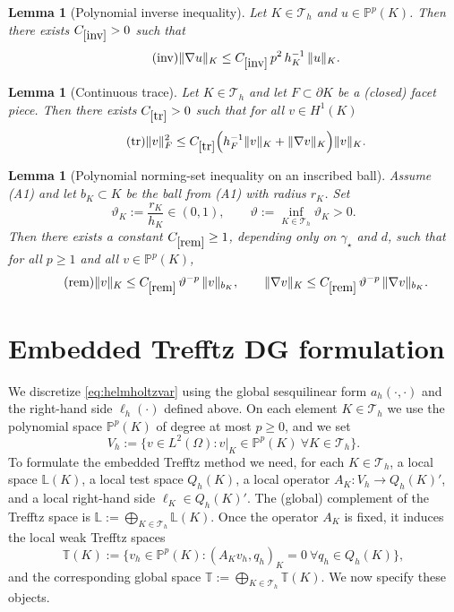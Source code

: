 \documentclass[11pt]{article}
\theoremstyle{definition}
\theoremstyle{plain}
\newtheorem{lemma}[theorem]{Lemma}
\newcommand{\const}[1]{C_{\eqref{#1}}}
\newcommand{\Th}{{\calT_h}}
\newcommand{\AK}{{A_K}}
\newcommand{\ILh}{\mathbb{L}}
\newcommand{\LKh}{\mathbb{L}(K)}
\newcommand{\QKh}{Q_h(K)}
\newcommand{\inner}[1]{( #1 )}
\newcommand{\IP}{\mathbb{P}}
\newcommand{\ITh}{\mathbb{T}}
\newcommand{\calT}{\mathcal{T}}
\begin{document}
\begin{lemma}[Polynomial inverse inequality]\label{lem:inv}
Let $K\in\Th$ and $u\in\IP^p(K)$. Then there exists $\const{inv}>0$ such that
\begin{equation}\tag{inv}\label{inv}
  \|\nabla u\|_{K} \leq \const{inv}\,p^2\,h_K^{-1}\,\|u\|_{K}.
\end{equation}
\end{lemma}

\begin{lemma}[Continuous trace]\label{lem:tr}
Let $K\in\Th$ and let $F\subset\partial K$ be a (closed) facet piece. Then there exists $\const{tr}>0$ such that
for all $v\in H^1(K)$
\begin{equation}\tag{tr}\label{tr}
  \|v\|_{F}^2 \leq \const{tr}
  \Big( h_F^{-1}\|v\|_{K} + \|\nabla v\|_{K}\Big)\|v\|_{K}.
\end{equation}
\end{lemma}

\begin{lemma}[Polynomial norming-set inequality on an inscribed ball]\label{lem:norming}
Assume \textup{(A1)} and let $b_K\subset K$ be the ball from \textup{(A1)} with radius $r_K$.
Set
\[
\vartheta_K := \frac{r_K}{h_K}\in(0,1),
\qquad \vartheta := \inf_{K\in\Th}\vartheta_K>0.
\]
Then there exists a constant $\const{rem}\ge 1$, depending only on $\gamma_\star$ and $d$, such that
for all $p\ge 1$ and all $v\in \IP^p(K)$,
\begin{equation}\tag{rem}\label{rem}
\|v\|_{K} \le \const{rem}\,\vartheta^{-p}\,\|v\|_{b_K},
\qquad
\|\nabla v\|_{K} \le \const{rem}\,\vartheta^{-p}\,\|\nabla v\|_{b_K}.
\end{equation}
\end{lemma}





\section{Embedded Trefftz DG formulation}\label{sec:etdg}
We discretize \eqref{eq:helmholtzvar} using the global sesquilinear form $a_h(\cdot,\cdot)$ and the right-hand side $\ell_h(\cdot)$ defined above. On each element $K\in\Th$ we use the polynomial space $\IP^p(K)$ of degree at most $p\ge 0$, and we set
\[
V_h := \{v\in L^2(\Omega): v|_K\in \IP^p(K)\ \forall K\in\Th\}.
\]
To formulate the embedded Trefftz method we need, for each $K\in\Th$, a local space $\LKh$, a local test space $\QKh$, a local operator $\AK:V_h\to\QKh'$, and a local right-hand side $\ell_K\in\QKh'$. The (global) complement of the Trefftz space is
$
\ILh := \bigoplus_{K\in\Th}\LKh .
$
Once the operator $\AK$ is fixed, it induces the local weak Trefftz spaces
\[
\ITh(K) := \{v_h\in \IP^p(K): \inner{\AK v_h,q_h}_K = 0 \ \forall q_h\in\QKh\},
\]
and the corresponding global space
$
\ITh := \bigoplus_{K\in\Th}\ITh(K).
$
We now specify these objects.
\end{document}
